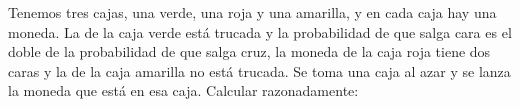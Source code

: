 \documentclass[addpoints,spanish, 12pt,a4paper]{exam}
\begin{document}
\begin{questions}


\question[4] Tenemos tres cajas, una verde, una roja y una amarilla, y en cada caja hay una moneda. La de
la caja verde está trucada y la probabilidad de que salga cara es el doble de la probabilidad de que salga
cruz, la moneda de la caja roja tiene dos caras y la de la caja amarilla no está trucada. Se toma una caja al
azar y se lanza la moneda que está en esa caja. Calcular razonadamente:
\begin{solution}
    
\end{solution}

\end{questions}
\end{document}
